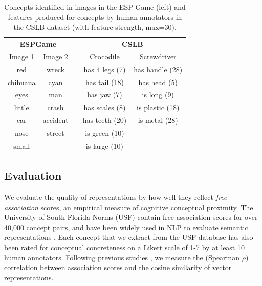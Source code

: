  \begin{table}[t]\begin{center}\begin{tabular}{c|ccc|c}


\multicolumn{2}{c}{\bf ESPGame} &\multicolumn{1}{c}{} & \multicolumn{2}{c}{\bf CSLB}\\
 \underline{Image 1} &  \underline{Image 2} & &  \underline{Crocodile} & \underline{Screwdriver} \\ 
\footnotesize{red} &  \footnotesize{wreck} &  &  \footnotesize{has 4 legs (7)} &  \footnotesize{has handle (28)} \\ 
\footnotesize{chihuaua} &  \footnotesize{cyan} & &  \footnotesize{has tail (18)} &  \footnotesize{has head (5)} \\ 
\footnotesize{eyes} &  \footnotesize{man} & &  \footnotesize{has jaw (7)} & \footnotesize{is long (9)} \\ 
\footnotesize{little} &  \footnotesize{crash} & &  \footnotesize{has scales (8)} &   \footnotesize{is plastic (18)} \\ 
\footnotesize{ear} &  \footnotesize{accident} & &  \footnotesize{has teeth (20)} & \footnotesize{is metal (28)} \\ 
\footnotesize{nose}  &  \footnotesize{street} & &  \footnotesize{is green (10}) &  \\ 
\footnotesize{small} &   & & \footnotesize{is large (10)} &    \\ 






\end{tabular}\end{center}\caption{\label{font-table} Concepts identified in images in the ESP Game (left) and features produced for concepts by human annotators in the CSLB dataset (with feature strength, max=30).}\end{table}







\subsection{Evaluation}

We evaluate the quality of representations by how well they reflect \emph{free association} scores, an empirical measure of cognitive conceptual proximity. The University of South Florida Norms (USF) \cite{nelson2004university} contain free association scores for over 40,000 concept pairs, and have been widely used in NLP to evaluate semantic representations \cite{andrews2009integrating,feng2010visual,silberer2012grounded,rollermultimodal}. Each concept that we extract from the USF database has also been rated for conceptual concreteness on a Likert scale of 1-7 by at least 10 human annotators. Following previous studies \cite{huang2012improving,silberer2012grounded}, we measure the (Spearman \(\rho\)) correlation between association scores and the cosine similarity of vector representations.

